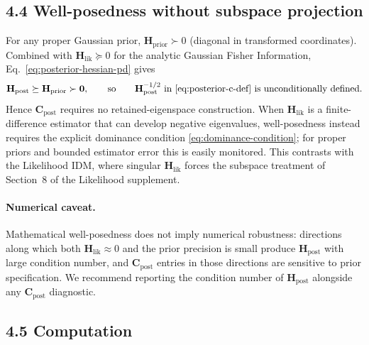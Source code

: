 \documentclass[11pt]{article}
\begin{document}
\subsection*{4.4 Well-posedness without subspace projection}

For any proper Gaussian prior, $\mathbf H_{\mathrm{prior}} \succ 0$ (diagonal in transformed coordinates). Combined with $\mathbf H_{\mathrm{lik}} \succeq 0$ for the analytic Gaussian Fisher Information, Eq.\ \eqref{eq:posterior-hessian-pd} gives
\begin{equation}
\mathbf H_{\mathrm{post}} \succeq \mathbf H_{\mathrm{prior}} \succ \mathbf 0,
\qquad \text{so}\qquad
\mathbf H_{\mathrm{post}}^{-1/2}\ \text{in \eqref{eq:posterior-c-def} is unconditionally defined.}
\label{eq:posterior-c-wellposed}
\end{equation}
Hence $\mathbf C_{\mathrm{post}}$ requires no retained-eigenspace construction. When $\mathbf H_{\mathrm{lik}}$ is a finite-difference estimator that can develop negative eigenvalues, well-posedness instead requires the explicit dominance condition \eqref{eq:dominance-condition}; for proper priors and bounded estimator error this is easily monitored. This contrasts with the Likelihood IDM, where singular $\mathbf H_{\mathrm{lik}}$ forces the subspace treatment of Section~8 of the Likelihood supplement.

\paragraph{Numerical caveat.}
Mathematical well-posedness does not imply numerical robustness: directions along which both $\mathbf H_{\mathrm{lik}} \approx 0$ and the prior precision is small produce $\mathbf H_{\mathrm{post}}$ with large condition number, and $\mathbf C_{\mathrm{post}}$ entries in those directions are sensitive to prior specification. We recommend reporting the condition number of $\mathbf H_{\mathrm{post}}$ alongside any $\mathbf C_{\mathrm{post}}$ diagnostic.

\subsection*{4.5 Computation}
\end{document}
